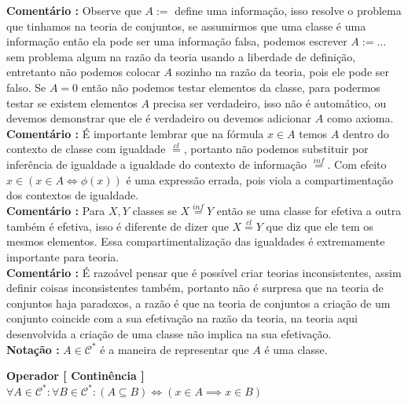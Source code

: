 \documentclass[10pt,a4paper]{report}
\begin{document}
\textbf{Comentário :} Observe que $A:=$ define uma informação, isso resolve o problema que tinhamos na teoria de conjuntos, se assumirmos que uma classe é uma informação então ela pode ser uma informação falsa, podemos escrever $A:= \dots$ sem problema algum na razão da teoria usando a liberdade de definição, entretanto não podemos colocar $A$ sozinho na razão da teoria, pois ele pode ser falso. Se $A=0$ então não podemos testar elementos da classe, para podermos testar se existem elementos $A$ precisa ser verdadeiro, isso não é automático, ou devemos demonstrar que ele é verdadeiro ou devemos adicionar $A$ como axioma.\\

\textbf{Comentário :} É importante lembrar que na fórmula $ x \in A $ temos $A$ dentro do contexto de classe com igualdade $\overset{cl}{=}$, portanto não podemos substituir por inferência de igualdade a igualdade do contexto de informação $\overset{inf}{=}$. Com efeito $ x \in ( x \in A \iff \phi(x) ) $ é uma expressão errada, pois viola a compartimentação dos contextos de igualdade. \\%

\textbf{Comentário :} Para $X,Y$ classes se $ X \overset{inf}{=} Y $ então se uma classe for efetiva a outra também é efetiva, isso é diferente de dizer que $ X \overset{cl}{=} Y $ que diz que ele tem os mesmos elementos. Essa compartimentalização das igualdades é extremamente importante para teoria. \\

\textbf{Comentário :} É razoável pensar que é possível criar teorias inconsistentes, assim definir coisas inconsistentes também, portanto não é surpresa que na teoria de conjuntos haja paradoxos, a razão é que na teoria de conjuntos a criação de um conjunto coincide com a sua efetivação na razão da teoria, na teoria aqui desenvolvida a criação de uma classe não implica na sua efetivação.\\

\textbf{Notação :} $A \in \mathcal{C}^*$ é a maneira de representar que $A$ é uma classe.

\hspace{\baselineskip}

\textbf{Operador [ Continência ]} $ \forall A \in \mathcal{C}^* : \forall B \in \mathcal{C}^* : (A \subseteq B) \iff ( x \in A \implies x \in B ) $\\
\end{document}
